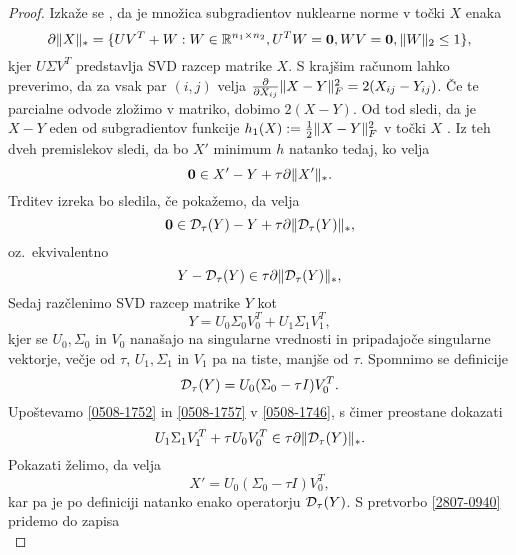 \begin{proof}
Izkaže se \cite{CCS}, da je množica subgradientov nuklearne norme v točki $X$ enaka
\begin{equation}  \label{2807-0932}  
    \partial\lVert X\rVert_* = \{UV^T + W: W \in \mathbb{R}^{n_1 \times n_2}, U^TW = \mathbf{0}, WV = \mathbf{0}, \lVert W\rVert_2 \leq 1 \},
\end{equation}
kjer $U \Sigma V^T$ predstavlja SVD razcep matrike $X$. S krajšim računom lahko preverimo, da za vsak par $(i,j)$ velja $\frac{\partial}{\partial X_{ij}}\lVert X-Y\rVert_F^2 = 2(X_{ij} - Y_{ij})$. 
Če te parcialne odvode zložimo v matriko, dobimo $2(X-Y)$. Od tod sledi, da je $X-Y$ eden od subgradientov funkcije $h_1(X):=\frac{1}{2}\lVert X-Y\rVert_F^2$ v točki $X$ \cite[3.1.3]{boyd2004convex}.
Iz teh dveh premislekov sledi, da bo $X'$ minimum $h$ natanko tedaj, ko velja 
\begin{equation*}
    \mathbf{0} \in X' - Y + \tau \partial\lVert X'\rVert_*.
\end{equation*}
Trditev izreka bo sledila, če pokažemo, da velja 
\begin{equation*} 
    \mathbf{0} \in \mathcal{D}_\tau(Y) - Y + \tau \partial\lVert\mathcal{D}_\tau(Y)\rVert_*,
\end{equation*}
oz.\ ekvivalentno
\begin{equation} \label{0508-1746}
    Y-\mathcal{D}_\tau(Y) \in \tau \partial\lVert\mathcal{D}_\tau(Y)\rVert_*,
\end{equation}
Sedaj razčlenimo SVD razcep matrike $Y$ kot 
\begin{equation} \label{0508-1752}
    Y = U_0\Sigma_0V_0^T + U_1\Sigma_1V_1^T,
\end{equation}
kjer se $U_0, \Sigma_0$ in $V_0$ nanašajo na singularne vrednosti in pripadajoče singularne vektorje, večje od $\tau$, $U_1, \Sigma_1$ in $V_1$ pa na tiste, manjše od $\tau$. 
Spomnimo se definicije 
\begin{equation} \label{0508-1757}
\mathcal{D}_\tau(Y)=U_0(\Sigma_0 - \tau I)V_0^T.
\end{equation}
Upoštevamo \eqref{0508-1752} in \eqref{0508-1757}  v \eqref{0508-1746}, s čimer preostane dokazati
\begin{equation} \label{0508-1755}
    U_1\Sigma_1V_1^T+\tau U_0 V_0^T\in
    \tau \partial\lVert\mathcal{D}_\tau(Y)\rVert_*.
\end{equation}
\iffalse
Pokazati želimo, da velja 
\[
    X' = U_0(\Sigma_0 - \tau I)V_0^T,
\] 
kar pa je po definiciji natanko enako operatorju $\mathcal{D}_\tau(Y)$.
S pretvorbo \eqref{2807-0940} pridemo do zapisa
\begin{equation} \label{2807-0934}

\end{equation}
\end{proof}
